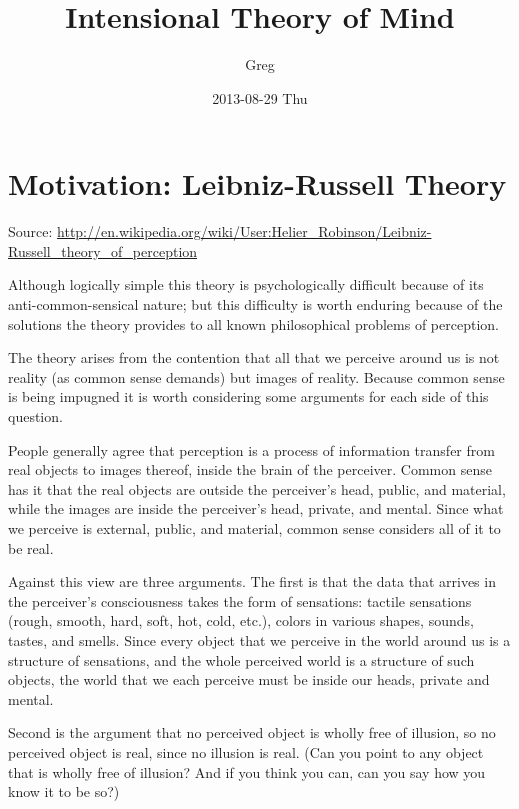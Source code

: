 \documentclass[11pt]{article}
\title{Intensional Theory of Mind}
\author{Greg}
\date{2013-08-29 Thu}
\begin{document}
\maketitle

\setcounter{tocdepth}{2}
\tableofcontents
\vspace*{1cm}

\section{Motivation: Leibniz-Russell Theory}
\label{sec-1}

Source: \href{http://en.wikipedia.org/wiki/User:Helier_Robinson/Leibniz-Russell_theory_of_perception}{http://en.wikipedia.org/wiki/User:Helier\_Robinson/Leibniz-Russell\_theory\_of\_perception}

Although logically simple this theory is psychologically difficult because of its anti-common-sensical nature; but this difficulty is worth enduring because of the solutions the theory provides to all known philosophical problems of perception.

The theory arises from the contention that all that we perceive around us is not reality (as common sense demands) but images of reality. Because common sense is being impugned it is worth considering some arguments for each side of this question.

People generally agree that perception is a process of information transfer from real objects to images thereof, inside the brain of the perceiver. Common sense has it that the real objects are outside the perceiver's head, public, and material, while the images are inside the perceiver's head, private, and mental. Since what we perceive is external, public, and material, common sense considers all of it to be real.

Against this view are three arguments. The first is that the data that arrives in the perceiver's consciousness takes the form of sensations: tactile sensations (rough, smooth, hard, soft, hot, cold, etc.), colors in various shapes, sounds, tastes, and smells. Since every object that we perceive in the world around us is a structure of sensations, and the whole perceived world is a structure of such objects, the world that we each perceive must be inside our heads, private and mental.

Second is the argument that no perceived object is wholly free of illusion, so no perceived object is real, since no illusion is real. (Can you point to any object that is wholly free of illusion? And if you think you can, can you say how you know it to be so?)
\end{document}
